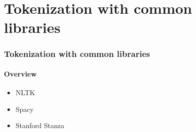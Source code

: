 \documentclass{beamer}
\begin{document}
%
%

\section{Tokenization with common libraries}
\begin{frame}
    \frametitle{Tokenization with common libraries}
    \framesubtitle{Overview}
    \begin{itemize}
        \item NLTK
        \item Spacy
        \item Stanford Stanza
    \end{itemize}
\end{frame}
\end{document}
